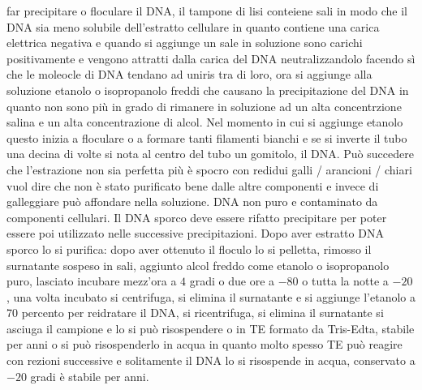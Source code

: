 far precipitare o floculare il DNA, il tampone di lisi conteiene sali in modo che il DNA sia meno solubile dell'estratto cellulare in quanto contiene una carica elettrica negativa e 
quando si aggiunge un sale in soluzione sono carichi positivamente e vengono attratti dalla carica del DNA neutralizzandolo facendo s\`i che le moleocle di DNA tendano ad uniris tra di
loro, ora si aggiunge alla soluzione etanolo o isopropanolo freddi che causano la precipitazione del DNA in quanto non sono pi\`u in grado di rimanere in soluzione ad un alta 
concentrzione salina e un alta concentrazione di alcol. Nel momento in cui si aggiunge etanolo questo inizia a floculare o a formare tanti filamenti bianchi e se si inverte il tubo una
decina di volte si nota al centro del tubo un gomitolo, il DNA. Pu\`o succedere che l'estrazione non sia perfetta pi\`u \`e spocro con redidui galli / arancioni / chiari vuol dire che
non \`e stato purificato bene dalle altre componenti e invece di galleggiare pu\`o affondare nella soluzione. DNA non puro e contaminato da componenti cellulari. Il DNA sporco deve 
essere rifatto precipitare per poter essere poi utilizzato nelle successive precipitazioni. Dopo aver estratto DNA sporco lo si purifica: dopo aver ottenuto il floculo lo si pelletta, 
rimosso il surnatante sospeso in sali, aggiunto alcol freddo come etanolo o isopropanolo puro, lasciato incubare mezz'ora a $4$ gradi o due ore a $-80$ o tutta la notte a $-20$, una volta
incubato si centrifuga, si elimina il surnatante e si aggiunge l'etanolo a 70 percento per reidratare il DNA, si ricentrifuga, si elimina il surnatante si asciuga il campione e lo si 
pu\`o risospendere o in TE formato da Tris-Edta, stabile per anni o si pu\`o risospenderlo in acqua in quanto molto spesso TE pu\`o reagire con rezioni successive e solitamente il DNA
lo si risospende in acqua, conservato a $-20$ gradi \`e stabile per anni.

